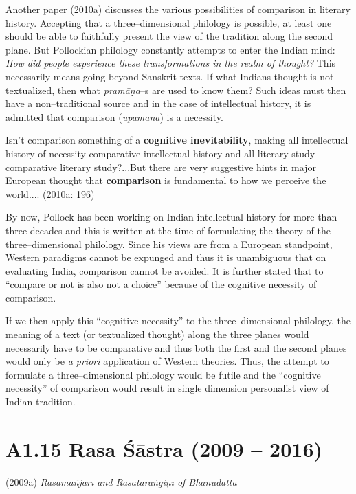 Another paper (2010a) discusses the various possibilities of comparison in literary history. Accepting that a three–dimensional philology is possible, at least one should be able to faithfully present the view of the tradition along the second plane. But Pollockian philology constantly attempts to enter the Indian mind:\textit{ How did people experience these transformations in the realm of thought?} This necessarily means going beyond Sanskrit texts. If what Indians thought is not textualized, then what \textit{pramāṇa}–s are used to know them? Such ideas must then have a non–traditional source and in the case of intellectual history, it is admitted that comparison (\textit{upamāna}) is a necessity.

\begin{myquote}
Isn’t comparison something of a \textbf{cognitive inevitability}, making all intellectual history of necessity comparative intellectual history and all literary study comparative literary study?...But there are very suggestive hints in major European thought that \textbf{comparison} is fundamental to how we perceive the world.... (2010a: 196)
\end{myquote}

By now, Pollock has been working on Indian intellectual history for more than three decades and this is written at the time of formulating the theory of the three–dimensional philology. Since his views are from a European standpoint, Western paradigms cannot be expunged and thus it is unambiguous that on evaluating India, comparison cannot be avoided. It is further stated that to “compare or not is also not a choice” because of the cognitive necessity of comparison.

If we then apply this “cognitive necessity” to the three–dimensional philology, the meaning of a text (or textualized thought) along the three planes would necessarily have to be comparative and thus both the first and the second planes would only be \textit{a priori} application of Western theories. Thus, the attempt to formulate a three–dimensional philology would be futile and the “cognitive necessity” of comparison would result in single dimension personalist view of Indian tradition.


\section*{A1.15 Rasa Śāstra (2009 – 2016)}

(2009a)\textit{ Rasamañjarī and Rasataraṅgiṇī of Bhānudatta }

